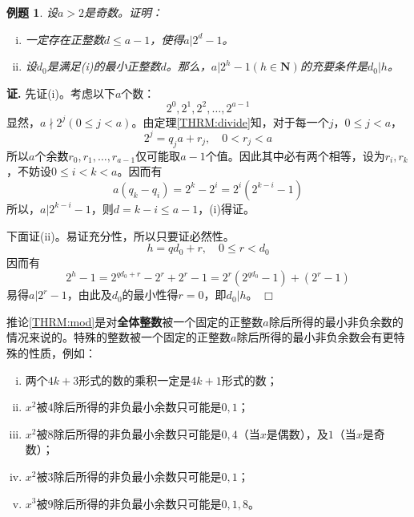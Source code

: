 \documentclass{ctexrep}
\newcommand{\bbold}[1]{\textbf{#1}}
\newcommand{\N}{\boldsymbol{N}}
\newtheorem{exmp}{例题}[section]
\renewenvironment{proof}[1][证]{\noindent \textbf{#1.} }{\hfill$\Box$}
\begin{document}
\begin{exmp}
设$a>2$是奇数。证明：
\begin{enumerate}[(i)]
\item 一定存在正整数$d \leq a-1$，使得$a|2^d-1$。
\item 设$d_0$是满足(i)的最小正整数$d$。那么，$a|2^h-1(h \in \N)$的充要条件是$d_0 | h$。
\end{enumerate}
\end{exmp}
\begin{proof}
先证(i)。考虑以下$a$个数：
\begin{displaymath}
2^0,2^1,2^2,\dotsc,2^{a-1}
\end{displaymath}
显然，$a \nmid 2^j(0 \leq j <a )$。由定理\ref{THRM:divide}知，对于每一个$j$，$0 \leq j <a$，
\begin{displaymath}
2^j=q_j a+r_j, \quad 0<r_j<a
\end{displaymath}
所以$a$个余数$r_0,r_1,\dotsc,r_{a-1}$仅可能取$a-1$个值。因此其中必有两个相等，设为$r_i,r_k$，不妨设$0\leq i<k<a$。因而有
\begin{displaymath}
a(q_k-q_i)=2^k-2^i=2^i(2^{k-i}-1)
\end{displaymath}
所以，$a|2^{k-i}-1$，则$d=k-i\leq a-1$，(i)得证。

下面证(ii)。易证充分性，所以只要证必然性。
\begin{displaymath}
h=qd_0+r, \quad 0\leq r<d_0
\end{displaymath}
因而有
\begin{displaymath}
2^h-1=2^{qd_0+r}-2^r+2^r-1=2^r(2^{qd_0}-1)+(2^r-1)
\end{displaymath}
易得$a|2^r-1$，由此及$d_0$的最小性得$r=0$，即$d_0|h$。
\end{proof}

推论\ref{THRM:mod}是对\bbold{全体整数}被一个固定的正整数$a$除后所得的最小非负余数的情况来说的。特殊的整数被一个固定的正整数$a$除后所得的最小非负余数会有更特殊的性质，例如：
\begin{enumerate}[(i)]
\item 两个$4k+3$形式的数的乘积一定是$4k+1$形式的数；
\item $x^2$被$4$除后所得的非负最小余数只可能是$0,1$；
\item $x^2$被$8$除后所得的非负最小余数只可能是$0,4$（当$x$是偶数），及$1$（当$x$是奇数）；
\item $x^2$被$3$除后所得的非负最小余数只可能是$0,1$；
\item $x^3$被$9$除后所得的非负最小余数只可能是$0,1,8$。
\end{enumerate}
\end{document}
